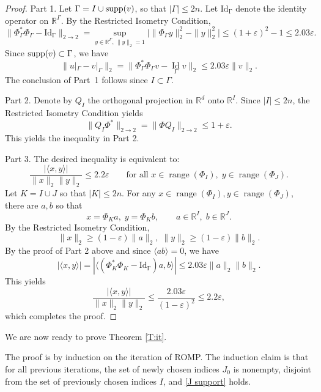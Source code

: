 \documentclass[12pt]{amsart}
\theoremstyle{plain}
\theoremstyle{definition}
\theoremstyle{remark}
\numberwithin{equation}{section}
\begin{document}
\begin{proof}

{\sc Part 1.}
Let $\Gamma = I\cup{{\rm supp}}(v)$, so that $|\Gamma| \leq 2n$. 
Let $\operatorname*{Id_\Gamma}$ denote the identity operator on ${\mathbb{R}}^\Gamma$. 
By the Restricted Isometry Condition,
$$
\|\Phi_\Gamma^*\Phi_\Gamma - \operatorname*{Id_\Gamma}\|_{2\rightarrow 2} 
= \sup_{y \in {\mathbb{R}}^\Gamma, \, \|y\|_2 = 1} \big| \|\Phi_\Gamma y\|_2^2 - \|y\|_2^2 \big| 
\le (1+{\varepsilon})^2 - 1
\le 2.03{\varepsilon}.
$$
Since ${{\rm supp}}(v) \subset \Gamma$, we have
$$
\|u|_\Gamma - v|_\Gamma\|_2 
= \|\Phi_\Gamma^*\Phi_\Gamma v - \operatorname*{Id}_\Gamma v\|_2 
\le 2.03{\varepsilon} \|v\|_2.
$$   
The conclusion of Part~1 follows since $I\subset \Gamma$.

\medskip

{\sc Part 2.} Denote by $Q_I$ the orthogonal projection in ${\mathbb{R}}^d$ 
onto ${\mathbb{R}}^I$. Since $|I| \le 2n$, the Restricted Isometry Condition yields
$$    
\|Q_I\Phi^*\|_{2\rightarrow 2} = \|\Phi Q_I\|_{2 \rightarrow 2} \leq 1 + {\varepsilon}.
$$
This yields the inequality in Part 2. 

\medskip

{\sc Part 3.} 
The desired inequality is equivalent to:
$$
\frac{|\langle x, y\rangle|}{\|x\|_2\|y\|_2} \leq 2.2{\varepsilon} \qquad \text{for all } x \in \operatorname*{range}(\Phi_I), \; y \in \operatorname*{range}(\Phi_J).
$$
Let $K = I \cup J$ so that $|K| \leq 2n$. For any $x \in \operatorname*{range}(\Phi_I), y \in \operatorname*{range}(\Phi_J)$, there are $a, b$ so that
$$
x = \Phi_K a, \; y = \Phi_K b, \qquad a \in {\mathbb{R}}^I, \; b \in {\mathbb{R}}^J.
$$
By the Restricted Isometry Condition,
$$
\|x\|_2 \geq (1-{\varepsilon})\|a\|_2, \; \|y\|_2 \geq (1-{\varepsilon})\|b\|_2.
$$
By the proof of Part 2 above and since $\langle a b \rangle = 0$, we have
$$
|\langle x, y\rangle| = |\langle (\Phi_K^* \Phi_K - \operatorname*{Id_\Gamma})a, b \rangle| \leq 2.03{\varepsilon}\|a\|_2\|b\|_2.
$$
This yields  
$$
\frac{|\langle x, y\rangle|}{\|x\|_2\|y\|_2} \leq \frac{2.03{\varepsilon}}{(1-{\varepsilon})^2} \leq 2.2{\varepsilon},
$$
which completes the proof.
\end{proof}

\bigskip

We are now ready to prove Theorem \ref{T:it}.

\medskip

The proof is by induction on the iteration of ROMP.
The induction claim is that for all previous iterations, the set of newly chosen 
indices $J_0$ is nonempty, disjoint from the set of previously chosen indices $I$, 
and \eqref{J support} holds.
 
\end{document}
